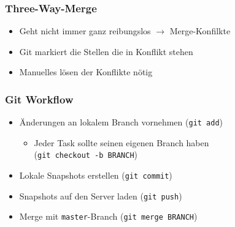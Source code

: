 \documentclass[12pt,utf8]{beamer}
\begin{document}
	\begin{frame}
		\begin{figure}[h]
			\centering
		\end{figure}
	\end{frame}

	\begin{frame}
		\frametitle{Three-Way-Merge}
		\begin{itemize}
			\item Geht nicht immer ganz reibungslos $\rightarrow$ Merge-Konfilkte
			\item Git markiert die Stellen die in Konflikt stehen
			\item Manuelles lösen der Konflikte nötig
		\end{itemize}
	\end{frame}


	\begin{frame}
		\frametitle{Git Workflow}
		\begin{itemize}
			\item Änderungen an lokalem Branch vornehmen (\texttt{git add})
			\begin{itemize}
				\item Jeder Task sollte seinen eigenen Branch haben\\ (\texttt{git checkout -b BRANCH})
			\end{itemize}
			\item Lokale Snapshots erstellen (\texttt{git commit})
			\item Snapshots auf den Server laden (\texttt{git push})
			\item Merge mit \texttt{master}-Branch (\texttt{git merge BRANCH})
		\end{itemize}
	\end{frame}
\end{document}
